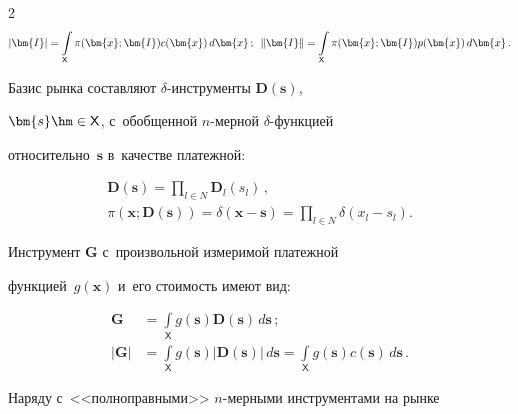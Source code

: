 \begin{multicols}{2}
  $$


  \vert \bm{I}\vert =\int\limits_{\mathsf X} \pi (\bm{x};\bm{I}) 


c(\bm{x})\,d\bm{x}\,;\enskip


  \left\| \bm{I}\right\| =\int\limits_{\mathsf X} \pi(\bm{x};\bm{I}) 


p(\bm{x})\,d\bm{x}\,.


  $$


  


  Базис рынка составляют $\delta$-ин\-стру\-мен\-ты $\bm{D}(\bm{s})$, 


$\bm{s}\hm\in {\mathsf X}$, с~обобщенной $n$-мер\-ной $\delta$-функ\-ци\-ей 


относительно~$\bm{s}$ в~качестве платежной: 





\noindent


  \begin{multline}


    \bm{D}(\bm{s}) =\prod\limits_{l\in N} \bm{D}_l(s_l)\,,\\


  \pi(\bm{x};\bm{D}(\bm{s}))=\delta(\bm{x}-\bm{s})=\prod\limits_{l\in N} 


\delta(x_l-s_l).


  \label{1-aga}


  \end{multline}


  


  Инструмент $\bm{G}$ с~произвольной измеримой платежной 


функцией~$g(\bm{x})$ и~его стоимость имеют вид: 


  \begin{align*}


  \bm{G}&= \int\limits_{\mathsf X} g(\bm{s}) \bm{D}(\bm{s})\,d\bm{s}\,;\\


  \vert \bm{G}\vert &=\int\limits_{\mathsf X} g(\bm{s}) \vert \bm{D}(\bm{s}) \vert 


\,d\bm{s}= \int\limits_{\mathsf X} g(\bm{s}) c(\bm{s}) \,d\bm{s}\,.


  \end{align*}


  


  Наряду с~<<полноправными>> $n$-мер\-ны\-ми инструментами на рынке 



\end{multicols}
